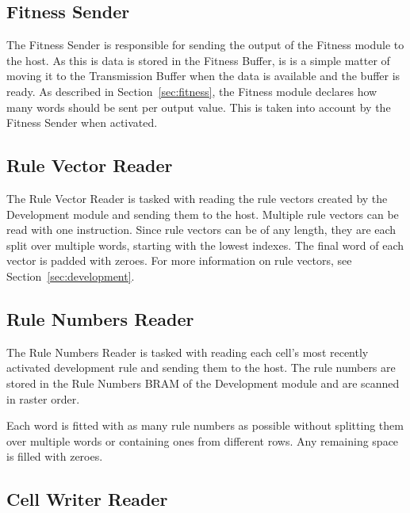 \subsection{Fitness Sender}

The Fitness Sender is responsible for sending the output of the Fitness module to the host.
As this is data is stored in the Fitness Buffer, is is a simple matter of moving it to the Transmission Buffer when the data is available and the buffer is ready.
As described in Section~\ref{sec:fitness}, the Fitness module declares how many words should be sent per output value.
This is taken into account by the Fitness Sender when activated.

\subsection{Rule Vector Reader}

The Rule Vector Reader is tasked with reading the rule vectors created by the Development module and sending them to the host.
Multiple rule vectors can be read with one instruction.
Since rule vectors can be of any length, they are each split over multiple words, starting with the lowest indexes.
The final word of each vector is padded with zeroes.
For more information on rule vectors, see Section~\ref{sec:development}.

\subsection{Rule Numbers Reader}
\label{sec:rule-numbers-reader}

The Rule Numbers Reader is tasked with reading each cell's most recently activated development rule and sending them to the host.
The rule numbers are stored in the Rule Numbers BRAM of the Development module and are scanned in raster order\footnotemark.

Each word is fitted with as many rule numbers as possible without splitting them over multiple words or containing ones from different rows.
Any remaining space is filled with zeroes.

\subsection{Cell Writer Reader}

